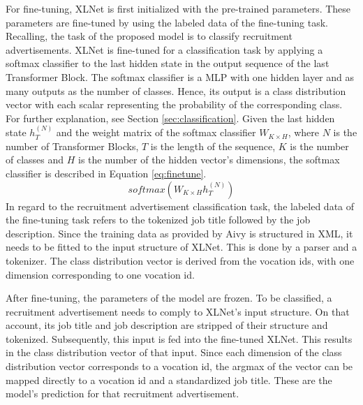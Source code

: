 \par
For fine-tuning, XLNet is first initialized with the pre-trained parameters. These parameters are fine-tuned by using the labeled data of the fine-tuning task. Recalling, the task of the proposed model is to classify recruitment advertisements. XLNet is fine-tuned for a classification task by applying a softmax classifier to the last hidden state in the output sequence of the last Transformer Block. The softmax classifier is a \ac{MLP} with one hidden layer and as many outputs as the number of classes. Hence, its output is a class distribution vector with each scalar representing the probability of the corresponding class. For further explanation, see Section \ref{sec:classification}. Given the last hidden state $h_T^{(N)}$ and the weight matrix of the softmax classifier $W_{K \times H}$, where $N$ is the number of Transformer Blocks, $T$ is the length of the sequence, $K$ is the number of classes and $H$ is the number of the hidden vector's dimensions, the softmax classifier is described in Equation \eqref{eq:finetune}.\autocites{Yang.2019}{Devlin.2018}
\begin{equation}
	\label{eq:finetune}
	softmax(W_{K \times H}h_T^{(N)})
\end{equation}
In regard to the recruitment advertisement classification task, the labeled data of the fine-tuning task refers to the tokenized job title followed by the job description. Since the training data as provided by Aivy is structured in XML, it needs to be fitted to the input structure of XLNet. This is done by a parser and a tokenizer. The class distribution vector is derived from the vocation ids, with one dimension corresponding to one vocation id.
\par
After fine-tuning, the parameters of the model are frozen. To be classified, a recruitment advertisement needs to comply to XLNet's input structure. On that account, its job title and job description are stripped of their structure and tokenized. Subsequently, this input is fed into the fine-tuned XLNet. This results in the class distribution vector of that input. Since each dimension of the class distribution vector corresponds to a vocation id, the argmax of the vector can be mapped directly to a vocation id and a standardized job title. These are the model's prediction for that recruitment advertisement.
